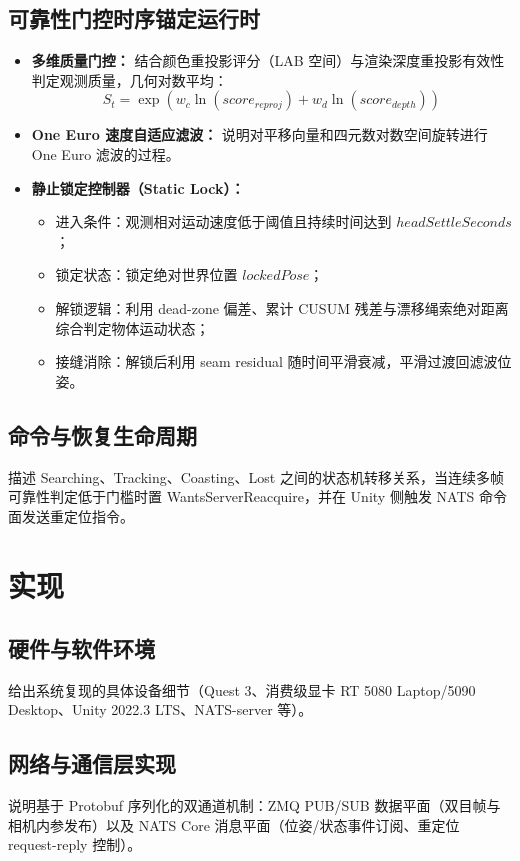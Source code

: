 \documentclass[review]{vgtc}
\begin{document}
\subsection{可靠性门控时序锚定运行时}
\begin{itemize}
  \item \textbf{多维质量门控：} 结合颜色重投影评分（LAB 空间）与渲染深度重投影有效性判定观测质量，几何对数平均：
  \[
  S_t = \exp \left( w_c \ln(score_{reproj}) + w_d \ln(score_{depth}) \right)
  \]
  \item \textbf{One Euro 速度自适应滤波：} 说明对平移向量和四元数对数空间旋转进行 One Euro 滤波的过程。
  \item \textbf{静止锁定控制器（Static Lock）：}
    \begin{itemize}
      \item 进入条件：观测相对运动速度低于阈值且持续时间达到 $headSettleSeconds$；
      \item 锁定状态：锁定绝对世界位置 $lockedPose$；
      \item 解锁逻辑：利用 dead-zone 偏差、累计 CUSUM 残差与漂移绳索绝对距离综合判定物体运动状态；
      \item 接缝消除：解锁后利用 seam residual 随时间平滑衰减，平滑过渡回滤波位姿。
    \end{itemize}
\end{itemize}

\subsection{命令与恢复生命周期}
描述 Searching、Tracking、Coasting、Lost 之间的状态机转移关系，当连续多帧可靠性判定低于门槛时置 WantsServerReacquire，并在 Unity 侧触发 NATS 命令面发送重定位指令。

\section{实现}

\subsection{硬件与软件环境}
给出系统复现的具体设备细节（Quest 3、消费级显卡 RT 5080 Laptop/5090 Desktop、Unity 2022.3 LTS、NATS-server 等）。

\subsection{网络与通信层实现}
说明基于 Protobuf 序列化的双通道机制：ZMQ PUB/SUB 数据平面（双目帧与相机内参发布）以及 NATS Core 消息平面（位姿/状态事件订阅、重定位 request-reply 控制）。
\end{document}
